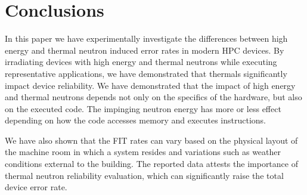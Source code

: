 \section{Conclusions}
\label{sec_conclusion}

In this paper we have experimentally investigate the differences between high
energy and thermal neutron induced error rates in modern HPC devices. %
By irradiating devices  with high energy and thermal neutrons while executing representative applications,  we have demonstrated that thermals significantly impact device reliability.
We have demonstrated that the impact of high energy and thermal neutrons depends not only on the specifics of the hardware, but also on the executed code. The impinging neutron energy has more or less effect depending on how the code accesses memory and executes instructions. 

We have also shown that the FIT rates can vary based on the physical layout of the machine room in which a system resides and variations such as weather conditions external to the building. 
%
The reported data attests the importance of thermal neutron reliability
evaluation, which can significantly raise the total device error rate. %
